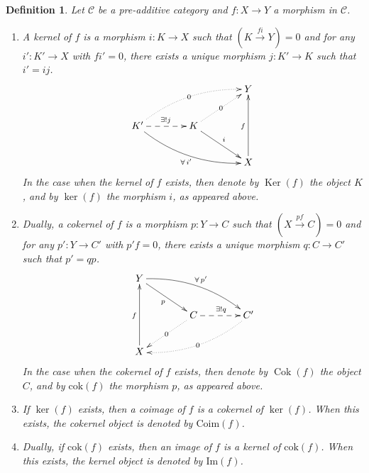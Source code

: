 \documentclass[11pt,a4paper]{article}
\numberwithin{equation}{section}
\theoremstyle{all}
\newtheorem{definition}[theorem]{Definition}
\theoremstyle{remark}
\newcommand{\CC}{\mathcal{C}}
\newcommand{\Ker}{\operatorname{Ker}\nolimits}
\newcommand{\Cok}{\operatorname{Cok}\nolimits}
\newcommand{\defn}[1]{\textsl{\color{darkblue} #1}}
\begin{document}
\begin{definition}
Let $\CC$ be a pre-additive category and $f:X\to Y$ a morphism in $\CC$.
\begin{enumerate}
\item A \defn{kernel} of $f$ is a morphism $i:K\to X$ such that $(K\xrightarrow{fi}Y)=0$ and for any $i':K'\to X$ with $fi'=0$, there exists a unique morphism $j:K'\to K$ such that $i'=ij$.
\[
\xymatrix@C=40pt{ & &  Y \\
K' \ar@/_1pc/[rrd]_{\forall\,i'} \ar@/^1pc/@{.>}[rru]|{0} \ar@{-->}[r]^{\exists! j} & K \ar[rd]^{i}\ar@{.>}[ru]|{0} & \\
& & X \ar[uu]^{f} \\ 
}
\]
In the case when the kernel of $f$ exists, then denote by $\Ker(f)$ the object $K$, and by $\ker(f)$ the morphism $i$, as appeared above.

\item Dually, a \defn{cokernel} of $f$ is a morphism $p:Y\to C$ such that $(X\xrightarrow{pf}C)=0$ and for any $p':Y\to C'$ with $p'f=0$, there exists a unique morphism $q:C\to C'$ such that $p'=qp$.
\[
\xymatrix@C=40pt{ Y \ar[rd]_{p} \ar@/^1pc/[rrd]^{\forall\,p'}& &  \\
& C \ar@{.>}[ld]|{0} \ar@{-->}[r]^{\exists! q} & C' \ar@/^1pc/@{.>}[lld]|{0} \\
X \ar[uu]^{f} & & \\ 
}
\]
In the case when the cokernel of $f$ exists, then denote by $\Cok(f)$ the object $C$, and by $\mathrm{cok}(f)$ the morphism $p$, as appeared above.

\item If $\ker(f)$ exists, then a \defn{coimage} of $f$ is a cokernel of $\ker(f)$.  When this exists, the cokernel object is denoted by $\mathrm{Coim}(f)$.

\item Dually, if $\mathrm{cok}(f)$ exists, then an \defn{image} of $f$ is a kernel of $\mathrm{cok}(f)$.  When this exists, the kernel object is denoted by $\mathrm{Im}(f)$.
\end{enumerate}
\end{definition}
\end{document}
